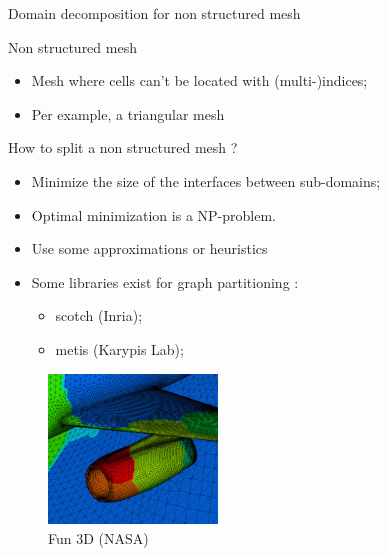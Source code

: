 \documentclass[compress,10pt,aspectratio=169]{beamer}
\begin{document}
\begin{frame}[fragile]{Domain decomposition for non structured mesh}
    \scriptsize

    \begin{multicols}{2}
    \begin{block}{\small Non structured mesh}
        \begin{itemize}
            \item Mesh where cells can't be located with (multi-)indices;
            \item Per example, a triangular mesh
        \end{itemize}
    \end{block}

    \begin{exampleblock}{\small How to split a non structured mesh ?}
        \begin{itemize}
            \item Minimize the size of the interfaces between sub-domains;
            \item Optimal minimization is a NP-problem. 
            \item Use some approximations or heuristics
            \item Some libraries exist for graph partitioning :
            \begin{itemize}
                \item {\scriptsize scotch (Inria);}
                \item {\scriptsize metis (Karypis Lab)};
            \end{itemize}
        \end{itemize}
    \end{exampleblock}

    \begin{figure}[h]
    \includegraphics[width=0.40\textwidth]{../Images/grid_decomposition.png}
    \caption{Fun 3D (NASA)}
    \end{figure}
\end{multicols}
\end{frame}
\end{document}
